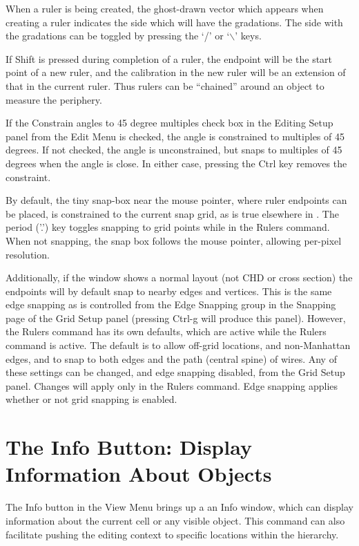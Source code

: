 When a ruler is being created, the ghost-drawn vector which appears
when creating a ruler indicates the side which will have the
gradations.  The side with the gradations can be toggled by pressing
the `/' or `$\backslash$' keys.

If {\kb Shift} is pressed during completion of a ruler, the endpoint
will be the start point of a new ruler, and the calibration in the new
ruler will be an extension of that in the current ruler.  Thus rulers
can be ``chained'' around an object to measure the periphery.

If the {\cb Constrain angles to 45 degree multiples} check box in the
{\cb Editing Setup} panel from the {\cb Edit Menu} is checked, the
angle is constrained to multiples of 45 degrees.  If not checked, the
angle is unconstrained, but snaps to multiples of 45 degrees when the
angle is close.  In either case, pressing the {\kb Ctrl} key removes
the constraint.

By default, the tiny snap-box near the mouse pointer, where ruler
endpoints can be placed, is constrained to the current snap grid, as
is true elsewhere in {\Xic}.  The period ('.') key toggles
snapping to grid points while in the {\cb Rulers} command.  When not
snapping, the snap box follows the mouse pointer, allowing per-pixel
resolution.

Additionally, if the window shows a normal layout (not CHD or cross
section) the endpoints will by default snap to nearby edges and
vertices.  This is the same edge snapping as is controlled from the
{\cb Edge Snapping} group in the {\cb Snapping} page of the {\cb Grid
Setup} panel (pressing {\kb Ctrl-g} will produce this panel). 
However, the {\cb Rulers} command has its own defaults, which are
active while the {\cb Rulers} command is active.  The default is to
allow off-grid locations, and non-Manhattan edges, and to snap to both
edges and the path (central spine) of wires.  Any of these settings
can be changed, and edge snapping disabled, from the {\cb Grid Setup}
panel.  Changes will apply only in the {\cb Rulers} command.  Edge
snapping applies whether or not grid snapping is enabled.


\section{The {\cb Info} Button: Display Information About Objects}
The {\cb Info} button in the {\cb View Menu} brings up a an {\cb Info}
window, which can display information about the current cell or any
visible object.  This command can also facilitate pushing the editing
context to specific locations within the hierarchy.

